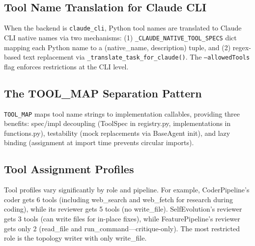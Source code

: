 \subsection{Tool Name Translation for Claude CLI}

When the backend is \texttt{claude\_cli}, Python tool names are translated to Claude CLI native names via two mechanisms: (1) \texttt{\_CLAUDE\_NATIVE\_TOOL\_SPECS} dict mapping each Python name to a (native\_name, description) tuple, and (2) regex-based text replacement via \texttt{\_translate\_task\_for\_claude()}. The \texttt{--allowedTools} flag enforces restrictions at the CLI level.

\subsection{The TOOL\_MAP Separation Pattern}

\texttt{TOOL\_MAP} maps tool name strings to implementation callables, providing three benefits: spec/impl decoupling (ToolSpec in registry.py, implementations in functions.py), testability (mock replacements via BaseAgent init), and lazy binding (assignment at import time prevents circular imports).

\subsection{Tool Assignment Profiles}

Tool profiles vary significantly by role and pipeline. For example, CoderPipeline's coder gets 6 tools (including web\_search and web\_fetch for research during coding), while its reviewer gets 5 tools (no write\_file). SelfEvolution's reviewer gets 3 tools (can write files for in-place fixes), while FeaturePipeline's reviewer gets only 2 (read\_file and run\_command---critique-only). The most restricted role is the topology writer with only write\_file.
